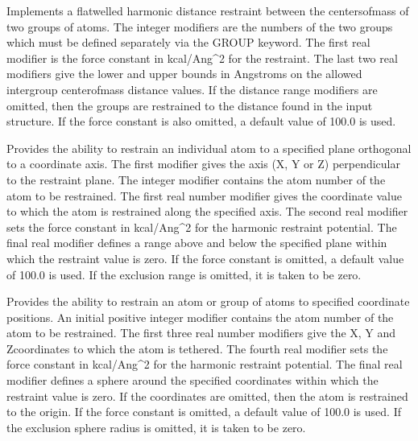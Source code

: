 \documentclass[letterpaper,11pt,english]{sphinxmanual}
\begin{document}
  Implements a flat\sphinxhyphen{}welled harmonic distance restraint between the centers\sphinxhyphen{}of\sphinxhyphen{}mass of two groups of atoms. The integer modifiers are the numbers of the two groups which must be defined separately via the GROUP keyword. The first real modifier is the force constant in kcal/Ang\textasciicircum{}2 for the restraint. The last two real modifiers give the lower and upper bounds in Angstroms on the allowed intergroup center\sphinxhyphen{}of\sphinxhyphen{}mass distance values. If the distance range modifiers are omitted, then the groups are restrained to the distance found in the input structure. If the force constant is also omitted, a default value of 100.0 is used.

  Provides the ability to restrain an individual atom to a specified plane orthogonal to a coordinate axis. The first modifier gives the axis (X, Y or Z) perpendicular to the restraint plane. The integer modifier contains the atom number of the atom to be restrained. The first real number modifier gives the coordinate value to which the atom is restrained along the specified axis. The second real modifier sets the force constant in kcal/Ang\textasciicircum{}2 for the harmonic restraint potential. The final real modifier defines a range above and below the specified plane within which the restraint value is zero. If the force constant is omitted, a default value of 100.0 is used. If the exclusion range is omitted, it is taken to be zero.

  Provides the ability to restrain an atom or group of atoms to specified coordinate positions. An initial positive integer modifier contains the atom number of the atom to be restrained. The first three real number modifiers give the X\sphinxhyphen{}, Y\sphinxhyphen{} and Z\sphinxhyphen{}coordinates to which the atom is tethered. The fourth real modifier sets the force constant in kcal/Ang\textasciicircum{}2 for the harmonic restraint potential. The final real modifier defines a sphere around the specified coordinates within which the restraint value is zero. If the coordinates are omitted, then the atom is restrained to the origin. If the force constant is omitted, a default value of 100.0 is used. If the exclusion sphere radius is omitted, it is taken to be zero.
\end{document}
